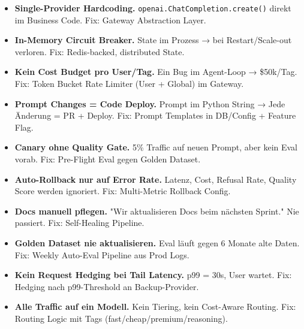 \begin{itemize}
    \item \textbf{Single-Provider Hardcoding.} \texttt{openai.ChatCompletion.create()} direkt im Business Code. Fix: Gateway Abstraction Layer.
    \item \textbf{In-Memory Circuit Breaker.} State im Prozess → bei Restart/Scale-out verloren. Fix: Redis-backed, distributed State.
    \item \textbf{Kein Cost Budget pro User/Tag.} Ein Bug im Agent-Loop → \$50k/Tag. Fix: Token Bucket Rate Limiter (User + Global) im Gateway.
    \item \textbf{Prompt Changes = Code Deploy.} Prompt im Python String → Jede Änderung = PR + Deploy. Fix: Prompt Templates in DB/Config + Feature Flag.
    \item \textbf{Canary ohne Quality Gate.} 5\% Traffic auf neuen Prompt, aber kein Eval vorab. Fix: Pre-Flight Eval gegen Golden Dataset.
    \item \textbf{Auto-Rollback nur auf Error Rate.} Latenz, Cost, Refusal Rate, Quality Score werden ignoriert. Fix: Multi-Metric Rollback Config.
    \item \textbf{Docs manuell pflegen.} "Wir aktualisieren Docs beim nächsten Sprint." Nie passiert. Fix: Self-Healing Pipeline.
    \item \textbf{Golden Dataset nie aktualisieren.} Eval läuft gegen 6 Monate alte Daten. Fix: Weekly Auto-Eval Pipeline aus Prod Logs.
    \item \textbf{Kein Request Hedging bei Tail Latency.} p99 = 30s, User wartet. Fix: Hedging nach p99-Threshold an Backup-Provider.
    \item \textbf{Alle Traffic auf ein Modell.} Kein Tiering, kein Cost-Aware Routing. Fix: Routing Logic mit Tags (fast/cheap/premium/reasoning).
\end{itemize}

